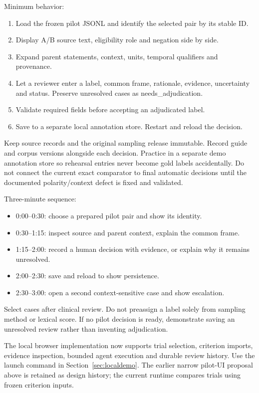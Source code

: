 \documentclass[10pt,letterpaper]{article}
\begin{document}
Minimum behavior:

\begin{enumerate}
\def\labelenumi{\arabic{enumi}.}
\item
  Load the frozen pilot JSONL and identify the selected pair by its stable ID.
\item
  Display A/B source text, eligibility role and negation side by side.
\item
  Expand parent statements, context, units, temporal qualifiers and provenance.
\item
  Let a reviewer enter a label, common frame, rationale, evidence, uncertainty and status. Preserve unresolved cases as needs\_adjudication.
\item
  Validate required fields before accepting an adjudicated label.
\item
  Save to a separate local annotation store. Restart and reload the decision.
\end{enumerate}

Keep source records and the original sampling release immutable. Record guide and corpus versions alongside each decision. Practice in a separate demo annotation store so rehearsal entries never become gold labels accidentally. Do not connect the current exact comparator to final automatic decisions until the documented polarity/context defect is fixed and validated.

Three-minute sequence:

\begin{itemize}
\item
  0:00--0:30: choose a prepared pilot pair and show its identity.
\item
  0:30--1:15: inspect source and parent context, explain the common frame.
\item
  1:15--2:00: record a human decision with evidence, or explain why it remains unresolved.
\item
  2:00--2:30: save and reload to show persistence.
\item
  2:30--3:00: open a second context-sensitive case and show escalation.
\end{itemize}

Select cases after clinical review. Do not preassign a label solely from sampling method or lexical score. If no pilot decision is ready, demonstrate saving an unresolved review rather than inventing adjudication.

The local browser implementation now supports trial selection, criterion imports, evidence inspection, bounded agent execution and durable review history. Use the launch command in Section~\ref{sec:localdemo}. The earlier narrow pilot-UI proposal above is retained as design history; the current runtime compares trials using frozen criterion inputs.
\end{document}
